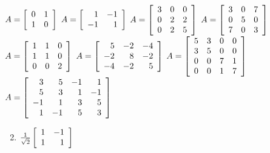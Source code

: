 \begin{multicols}{2}
\begin{ex}
\begin{exenumerate}[column-sep=-15pt]
\exitem $A = \left[ \begin{array}{rr}
0 & 1 \\
1 & 0
\end{array}\right]$
\exitem $A = \left[ \begin{array}{rr}
1 & -1 \\
-1 & 1
\end{array}\right]$
\exitem $A = \left[ \begin{array}{rrr}
3 & 0 & 0 \\
0 & 2 & 2 \\
0 & 2 & 5 
\end{array}\right]$
\exitem $A = \left[ \begin{array}{rrr}
3 & 0 & 7 \\
0 & 5 & 0 \\
7 & 0 & 3 
\end{array}\right]$
\exitem $A = \left[ \begin{array}{rrr}
1 & 1 & 0 \\
1 & 1 & 0 \\
0 & 0 & 2 
\end{array}\right]$
\exitem $A = \left[ \begin{array}{rrr}
5 & -2 & -4 \\
-2 & 8 & -2\\
-4 & -2 & 5 
\end{array}\right]$
\exitem* $A = \left[ \begin{array}{rrrr}
5 & 3 & 0 & 0 \\
3 & 5 & 0 & 0 \\
0 & 0 & 7 & 1 \\
0 & 0 & 1 & 7 
\end{array}\right]$
\exitem* $A = \left[ \begin{array}{rrrr}
3 & 5 & -1 & 1 \\
5 & 3 & 1 & -1 \\
-1 & 1 & 3 & 5 \\
1 & -1 & 5 & 3 
\end{array}\right]$
\end{exenumerate}
\begin{sol}
\begin{enumerate}[label={\alph*.}]
\setcounter{enumi}{1}
\item  $\tfrac{1}{\sqrt{2}}\left[ \begin{array}{rr}
1 & -1 \\
1 & 1
\end{array}\right]$


\end{enumerate}
\end{sol}
\end{ex}
\end{multicols}
